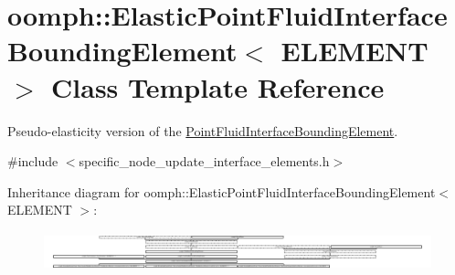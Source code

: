 \hypertarget{classoomph_1_1ElasticPointFluidInterfaceBoundingElement}{}\section{oomph\+:\+:Elastic\+Point\+Fluid\+Interface\+Bounding\+Element$<$ E\+L\+E\+M\+E\+NT $>$ Class Template Reference}
\label{classoomph_1_1ElasticPointFluidInterfaceBoundingElement}


Pseudo-\/elasticity version of the \hyperlink{classoomph_1_1PointFluidInterfaceBoundingElement}{Point\+Fluid\+Interface\+Bounding\+Element}.  




{\ttfamily \#include $<$specific\+\_\+node\+\_\+update\+\_\+interface\+\_\+elements.\+h$>$}

Inheritance diagram for oomph\+:\+:Elastic\+Point\+Fluid\+Interface\+Bounding\+Element$<$ E\+L\+E\+M\+E\+NT $>$\+:\begin{figure}[H]
\begin{center}
\leavevmode
\includegraphics[height=1.147541cm]{classoomph_1_1ElasticPointFluidInterfaceBoundingElement}
\end{center}
\end{figure}
